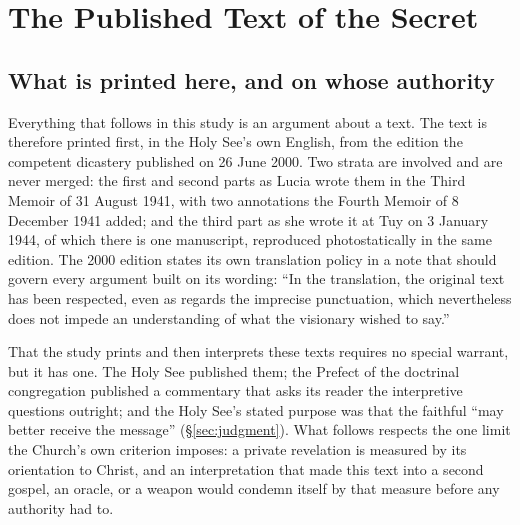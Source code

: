 \section{The Published Text of the Secret}\label{sec:text}

\subsection{What is printed here, and on whose authority}

Everything that follows in this study is an argument about a text.
The text is therefore printed first, in the Holy See's own English,
from the edition the competent dicastery published on 26 June 2000.
Two strata are involved and are never merged: the first and second
parts as Lucia wrote them in the Third Memoir of 31 August 1941, with
two annotations the Fourth Memoir of 8 December 1941 added; and the
third part as she wrote it at Tuy on 3 January 1944, of which there
is one manuscript, reproduced photostatically in the same edition.
The 2000 edition states its own translation policy in a note that
should govern every argument built on its wording: ``In the
translation, the original text has been respected, even as regards
the imprecise punctuation, which nevertheless does not impede an
understanding of what the visionary wished to say.''

That the study prints and then interprets these texts requires no
special warrant, but it has one. The Holy See published them; the
Prefect of the doctrinal congregation published a commentary that
asks its reader the interpretive questions outright; and the Holy
See's stated purpose was that the faithful ``may better receive the
message'' (\S\ref{sec:judgment}). What follows respects the one
limit the Church's own criterion imposes: a private revelation is
measured by its orientation to Christ, and an interpretation that
made this text into a second gospel, an oracle, or a weapon would
condemn itself by that measure before any authority had to.

